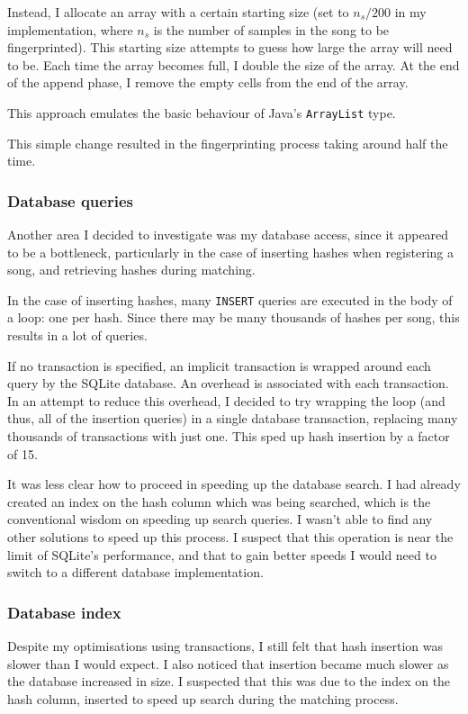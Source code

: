 \documentclass[12pt,a4paper,twoside,openright]{report}
\begin{document}
Instead, I allocate an array with a certain starting size (set to $n_s/200$ in my implementation, where $n_s$ is the number of samples in the song to be fingerprinted). This starting size attempts to guess how large the array will need to be. Each time the array becomes full, I double the size of the array. At the end of the append phase, I remove the empty cells from the end of the array.

This approach emulates the basic behaviour of Java's \lstinline{ArrayList} type.

This simple change resulted in the fingerprinting process taking around half the time.

\subsubsection{Database queries}

Another area I decided to investigate was my database access, since it appeared to be a bottleneck, particularly in the case of inserting hashes when registering a song, and retrieving hashes during matching.

In the case of inserting hashes, many \lstinline{INSERT} queries are executed in the body of a loop: one per hash. Since there may be many thousands of hashes per song, this results in a lot of queries.

If no transaction is specified, an implicit transaction is wrapped around each query by the SQLite database. An overhead is associated with each transaction. In an attempt to reduce this overhead, I decided to try wrapping the loop (and thus, all of the insertion queries) in a single database transaction, replacing many thousands of transactions with just one. This sped up hash insertion by a factor of 15.

It was less clear how to proceed in speeding up the database search. I had already created an index on the hash column which was being searched, which is the conventional wisdom on speeding up search queries. I wasn't able to find any other solutions to speed up this process. I suspect that this operation is near the limit of SQLite's performance, and that to gain better speeds I would need to switch to a different database implementation.

\subsubsection{Database index}

Despite my optimisations using transactions, I still felt that hash insertion was slower than I would expect. I also noticed that insertion became much slower as the database increased in size. I suspected that this was due to the index on the hash column, inserted to speed up search during the matching process.
\end{document}
